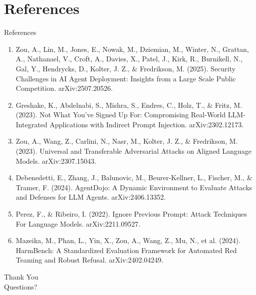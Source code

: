 \documentclass[10pt]{beamer}
\begin{document}
\section{References}
\begin{frame}[allowframebreaks]{References}
  \footnotesize
  \begin{enumerate}
    \item Zou, A., Lin, M., Jones, E., Nowak, M., Dziemian, M., Winter, N., Grattan, A., Nathanael, V., Croft, A., Davies, X., Patel, J., Kirk, R., Burnikell, N., Gal, Y., Hendrycks, D., Kolter, J. Z., \& Fredrikson, M. (2025). Security Challenges in AI Agent Deployment: Insights from a Large Scale Public Competition. arXiv:2507.20526.
    \item Greshake, K., Abdelnabi, S., Mishra, S., Endres, C., Holz, T., \& Fritz, M. (2023). Not What You've Signed Up For: Compromising Real-World LLM-Integrated Applications with Indirect Prompt Injection. arXiv:2302.12173.
    \item Zou, A., Wang, Z., Carlini, N., Nasr, M., Kolter, J. Z., \& Fredrikson, M. (2023). Universal and Transferable Adversarial Attacks on Aligned Language Models. arXiv:2307.15043.
    \item Debenedetti, E., Zhang, J., Balunovic, M., Beurer-Kellner, L., Fischer, M., \& Tramer, F. (2024). AgentDojo: A Dynamic Environment to Evaluate Attacks and Defenses for LLM Agents. arXiv:2406.13352.
    \item Perez, F., \& Ribeiro, I. (2022). Ignore Previous Prompt: Attack Techniques For Language Models. arXiv:2211.09527.
    \item Mazeika, M., Phan, L., Yin, X., Zou, A., Wang, Z., Mu, N., et al. (2024). HarmBench: A Standardized Evaluation Framework for Automated Red Teaming and Robust Refusal. arXiv:2402.04249.
  \end{enumerate}
\end{frame}
\begin{frame}[plain]
  \begin{center}
    {\Huge Thank You}\\[1em]
    {\large Questions?}
  \end{center}
\end{frame}
\end{document}
